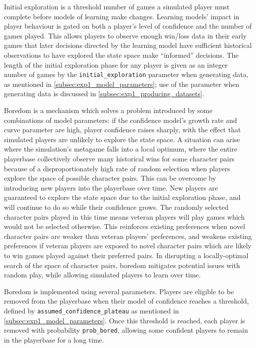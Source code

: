  Initial
exploration is a threshold number of games a simulated player must complete
before models of learning make changes. Learning models' impact in player
behaviour is gated on both a player's level of confidence and the number of
games played. This allows players to observe enough win/loss data in their early
games that later decisions directed by the learning model have sufficient
historical observations to have explored the state space make ``informed''
decisions. The length of the initial exploration phase for any player is given
as an integer number of games by the \lstinline{initial_exploration} parameter
when generating data, as mentioned in \cref{subsec:exp1_model_parameters}; use
of the parameter when generating data is discussed in
\cref{subsec:exp1_producing_datasets}.

Boredom is a mechanism which solves a problem introduced by some combinations of
model parameters: if the confidence model's growth rate and curve parameter are
high, player confidence raises sharply, with the effect that simulated players
are unlikely to explore the state space. A situation can arise where the
simulation's metagame falls into a local optimum, where the entire playerbase
collectively observe many historical wins for some character pairs because of a
disproportionately high rate of random selection when players explore the space
of possible character pairs. This can be overcome by introducing new players
into the playerbase over time. New players are guaranteed to explore the state
space due to the initial exploration phase, and will continue to do so while
their confidence grows. The randomly selected character pairs played in this
time means veteran players will play games which would not be selected
otherwise. This reinforces existing preferences when novel character pairs are
weaker than veteran players' preferences, and weakens existing preferences if
veteran players are exposed to novel character pairs which are likely to win
games played against their preferred pairs. In disrupting a locally-optimal
search of the space of character pairs, boredom mitigates potential issues with
random play, while allowing simulated players to learn over time.

Boredom is implemented using several parameters. Players are eligible to be
removed from the playerbase when their model of confidence reaches a threshold,
defined by \lstinline{assumed_confidence_plateau} as mentioned in
\cref{subsec:exp1_model_parameters}. Once this threshold is reached, each player
is removed with probability \lstinline{prob_bored}, allowing some confident
players to remain in the playerbase for a long time. 




